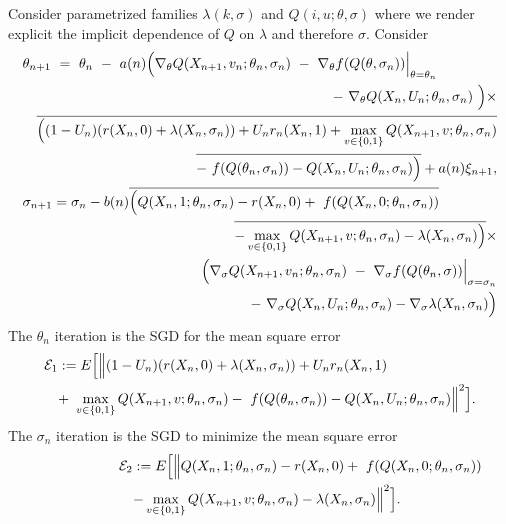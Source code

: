 \documentclass[10pt]{article}
\begin{document}
Consider parametrized families $\lambda(k,\sigma)$ and $Q(i , u; \theta, \sigma)$ where we render explicit the implicit dependence of $Q$ on $\lambda$ and therefore $\sigma$. Consider
\begin{eqnarray*}
\lefteqn{\theta_{n+1} \ = \  \theta_n \ - \  a(n)\Big(\nabla_\theta Q(X_{n+1},v_n;\theta_n,\sigma_n) \ - \ \nabla_\theta f(Q(\theta,\sigma_n))\Big|_{\theta = \theta_n} }\\
&& - \ \nabla_\theta Q(X_n,U_n;\theta_n,\sigma_n) \ \Big)\times  \\
&&\overline{\Big((1-U_n)(r(X_n,0) + \lambda(X_n,\sigma_n)) + U_nr_n(X_n,1) + \max_{v\in\{0,1\}}Q(X_{n+1},v;\theta_n,\sigma_n)}\\
&&\overline{ - \ f(Q(\theta_n,\sigma_n)) - Q(X_n,U_n;\theta_n,\sigma_n)\Big)} + a(n) \xi_{n+1},\\
\lefteqn{\sigma_{n+1} = \sigma_n - b(n)\overline{\Big(Q(X_n, 1;\theta_n,\sigma_n) - r(X_n,0)  + \ f(Q(X_n,0;\theta_n,\sigma_n))}}\\
&& \overline{- \max_{v\in\{0,1\}}Q(X_{n+1},v;\theta_n,\sigma_n) - \lambda(X_n,\sigma_n)\Big)} \times \\
&& \Big(\nabla_\sigma Q(X_{n+1},v_n;\theta_n,\sigma_n) \ - \ \nabla_\sigma f(Q(\theta_n,\sigma))\Big|_{\sigma = \sigma_n} \\
&& - \ \nabla_\sigma Q(X_n,U_n;\theta_n,\sigma_n) - \nabla_\sigma\lambda(X_n,\sigma_n)\Big)
\end{eqnarray*}
The $\theta_n$ iteration is the SGD for the mean square error
\begin{eqnarray*}
\lefteqn{\mathcal{E}_1 := E\Big[\Big\|(1-U_n)(r(X_n,0) + \lambda(X_n,\sigma_n)) + U_nr_n(X_n,1) }\\
&&+ \ \max_{v\in\{0,1\}}Q(X_{n+1},v;\theta_n,\sigma_n)
 - \ f(Q(\theta_n,\sigma_n)) - Q(X_n,U_n;\theta_n,\sigma_n)\Big\|^2\Big].
\end{eqnarray*}
The $\sigma_n$ iteration is the SGD to minimize the mean square error
\begin{eqnarray*}
\lefteqn{\mathcal{E}_2 := E\Big[\Big\|Q(X_n, 1;\theta_n,\sigma_n) - r(X_n,0)  + \ f(Q(X_n,0;\theta_n,\sigma_n))}\\
&& - \max_{v\in\{0,1\}}Q(X_{n+1},v;\theta_n,\sigma_n) - \lambda(X_n,\sigma_n)\Big\|^2\Big].
\end{eqnarray*}
\end{document}
